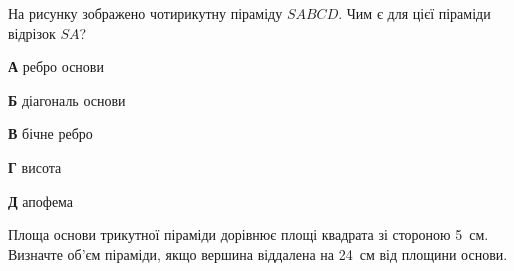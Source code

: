 \documentclass[12pt]{article}
\begin{document}
\begin{samepage}
\noindent\zadnum \begin{minipage}[t]{0.52\textwidth}
На рисунку зображено чотирикутну піраміду $SABCD$. Чим є для цієї піраміди відрізок $SA$? 

\nopagebreak\nbvspace{0.3cm}
\textbf{А} \quad ребро основи

\textbf{Б} \quad діагональ основи

\textbf{В} \quad бічне ребро

\textbf{Г} \quad висота

\textbf{Д} \quad апофема
\end{minipage}
\hfill
\begin{minipage}[t]{0.40\textwidth}
\nopagebreak\nbvspace{-0.3cm}
\begin{center}
\begin{nmtfit}\end{nmtfit}
\end{center}
\end{minipage}

\nmtnobreak
\nopagebreak\nbvspace{0.5cm}
\par{}\vspace{0.25cm}
\end{samepage}

\begin{samepage}
\noindent\zadnum Площа основи трикутної піраміди дорівнює площі квадрата зі стороною 5~см. Визначте об’єм піраміди, якщо вершина віддалена на 24~см від площини основи. 

\nmtnobreak
\nopagebreak\nbvspace{0.3cm}
\par{}
\end{samepage}
\end{document}
